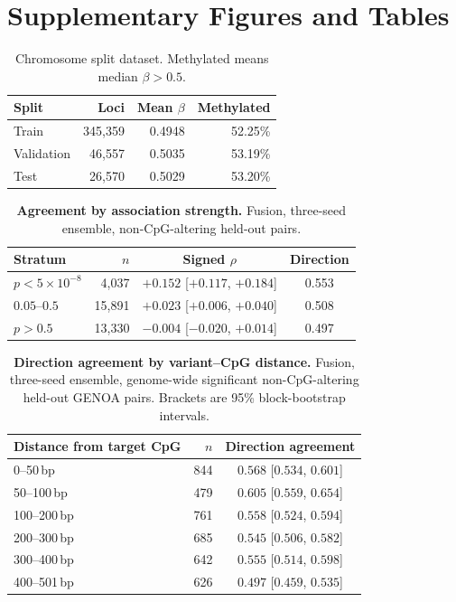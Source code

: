 \documentclass[10pt,letterpaper,twocolumn]{article}
\newif\ifsupplement
\begin{document}
\ifsupplement
\clearpage
\section*{Supplementary Figures and Tables}
\setcounter{table}{0}\setcounter{figure}{0}
\renewcommand{\thetable}{S\arabic{table}}
\renewcommand{\thefigure}{S\arabic{figure}}

\begin{table}[!htbp]
\centering
\caption{Chromosome split dataset. Methylated means median $\beta>0.5$.}
\label{tab:splits}
\small
\begin{tabular}{lrrr}
\toprule
Split & Loci & Mean $\beta$ & Methylated \\
\midrule
Train & 345,359 & 0.4948 & 52.25\% \\
Validation & 46,557 & 0.5035 & 53.19\% \\
Test & 26,570 & 0.5029 & 53.20\% \\
\bottomrule
\end{tabular}
\end{table}

\begin{table}[!htbp]
\centering
\caption{\textbf{Agreement by association strength.} Fusion, three-seed ensemble,
non-CpG-altering held-out pairs.}
\label{tab:gradient}
\small
\begin{tabular}{lrcc}
\toprule
Stratum & $n$ & Signed $\rho$ & Direction \\
\midrule
$p<5\times10^{-8}$ & 4,037 & $+0.152$ [$+0.117$, $+0.184$] & 0.553 \\
$0.05$--$0.5$ & 15,891 & $+0.023$ [$+0.006$, $+0.040$] & 0.508 \\
$p>0.5$ & 13,330 & $-0.004$ [$-0.020$, $+0.014$] & 0.497 \\
\bottomrule
\end{tabular}
\end{table}

\begin{table}[!htbp]
\centering
\caption{\textbf{Direction agreement by variant--CpG distance.} Fusion,
three-seed ensemble, genome-wide significant non-CpG-altering held-out GENOA
pairs. Brackets are 95\% block-bootstrap intervals.}
\label{tab:distance}
\small
\begin{tabular}{lrc}
\toprule
Distance from target CpG & $n$ & Direction agreement \\
\midrule
0--50\,bp & 844 & $0.568$ [$0.534$, $0.601$] \\
50--100\,bp & 479 & $\mathbf{0.605}$ [$0.559$, $0.654$] \\
100--200\,bp & 761 & $0.558$ [$0.524$, $0.594$] \\
200--300\,bp & 685 & $0.545$ [$0.506$, $0.582$] \\
300--400\,bp & 642 & $0.555$ [$0.514$, $0.598$] \\
400--501\,bp & 626 & $0.497$ [$0.459$, $0.535$] \\
\bottomrule
\end{tabular}
\end{table}
\end{document}
